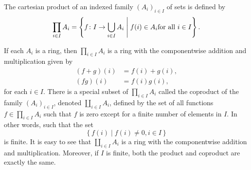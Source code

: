 \documentclass[11pt,a4paper]{article}
\begin{document}
\begin{exa}
The cartesian product of an indexed family $(A_i)_{i\in I}$ of  sets is defined by
\[\prod_{i\in I} A_i=\left\lbrace f\colon I \to \bigcup_{i\in I} A_i \;\Bigg|\;  f(i)\in A_i \text{for all } i\in I \right\rbrace.\]

If each $A_i$ is a ring, then $\prod_{i\in I} A_i$  is a ring with the componentwise addition and multiplication given by 
\begin{align*}
    (f+g)(i)&=f(i)+g(i),\\
    (fg)(i)&=f(i)g(i),
\end{align*}
for each $i\in I$. There is a special subset of $\prod_{i\in I} A_i$ called the coproduct of the family $(A_i)_{i\in I}$, denoted \(\coprod_{i\in I} A_i\), defined by the set of all functions $f\in \prod_{i\in I} A_i$ such that $f$ is zero except for a finite number of elements in $I$.
In other words, such that the set 
\[
\left\{ f(i) \mid f(i) \neq 0, i\in I \right\}
\]
is finite.
It is easy to see that \(\coprod_{i\in I} A_i\)  is a ring with the componentwise addition and multiplication.
Moreover, if \(I\) is finite, both the product and coproduct are exactly the same.
\end{exa}


\end{document}
